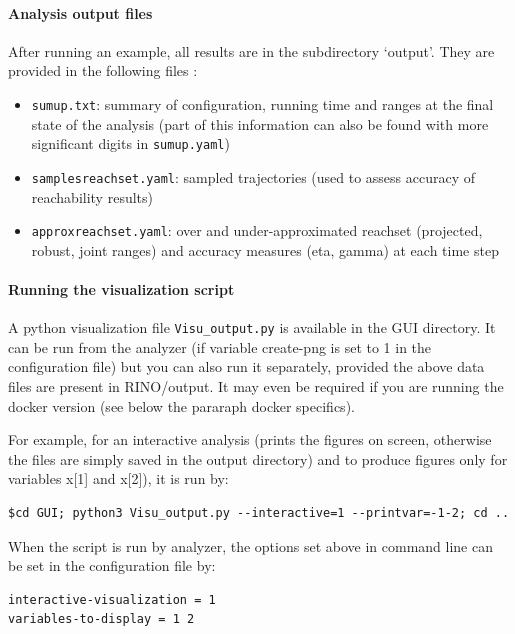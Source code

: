 \documentclass{article}
\begin{document}
\paragraph{Analysis output files}
After running an example, all results are in the subdirectory ‘output’. They are provided in the following files : 
\begin{itemize}[noitemsep]
\item \texttt{sumup.txt}: summary of configuration, running time and ranges at the final state of the analysis (part of this information can also be found with more significant digits in \texttt{sumup.yaml})
\item \texttt{samplesreachset.yaml}: sampled trajectories (used to assess accuracy of reachability results)
\item \texttt{approxreachset.yaml}: over and under-approximated reachset (projected, robust, joint ranges) and accuracy measures (eta, gamma) at each time step 
\end{itemize}

\paragraph{Running the visualization script}
A python visualization file \texttt{Visu\_output.py} is available in the GUI directory. It can be run from the analyzer (if variable create-png is set to 1 in the configuration file) but you can also run it separately,  provided the above data files are present in RINO/output.  It may even be required if you are running the docker version (see below the pararaph docker specifics).

For example, for an interactive analysis (prints the figures on screen, otherwise the files are simply saved in the output directory) and to produce figures only for variables x[1] and x[2]),  it is run by:
\begin{verbatim}
$cd GUI; python3 Visu_output.py --interactive=1 --printvar=-1-2; cd ..
\end{verbatim}
When the script is run by analyzer, the options set above in command line can be set in the configuration file by: 
\begin{verbatim}
interactive-visualization = 1
variables-to-display = 1 2
\end{verbatim}
\end{document}
